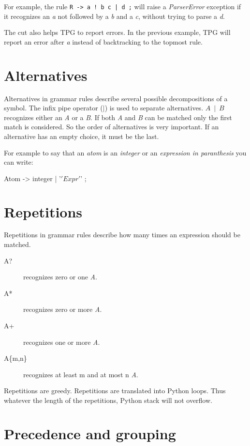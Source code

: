 For example, the rule \verb$R -> a ! b c | d ;$ will raise a \emph{ParserError} exception
if it recognizes an \emph{a} not followed by a \emph{b} and a \emph{c}, without trying to
parse a \emph{d}.

The cut also helps TPG to report errors.
In the previous example, TPG will report an error after \emph{a} instead of backtracking
to the topmost rule.

\section{Alternatives}											\label{parser:alternatives}

Alternatives in grammar rules describe several possible decompositions of a symbol.
The infix pipe operator (\emph{$\mid$}) is used to separate alternatives.
\emph{$A~\mid~B$} recognizes either an \emph{A} or a \emph{B}.
If both \emph{A} and \emph{B} can be matched only the first match is considered.
So the order of alternatives is very important.
If an alternative has an empty choice, it must be the last.

For example to say that an \emph{atom} is an \emph{integer} or an \emph{expression in paranthesis}
you can write:
\begin{verbatimtab}[4]
	Atom -> integer | '\(' Expr '\)' ;
\end{verbatimtab}

\section{Repetitions}											\label{parser:repetitions}

Repetitions in grammar rules describe how many times an expression should be matched.

\begin{description}
	\item [A?] recognizes zero or one \emph{A}.
	\item [A*] recognizes zero or more \emph{A}.
	\item [A+] recognizes one or more \emph{A}.
	\item [A\{m,n\}] recognizes at least m and at most n \emph{A}.
\end{description}

Repetitions are greedy.
Repetitions are translated into Python loops.
Thus whatever the length of the repetitions, Python stack will not overflow. 

\section{Precedence and grouping}

